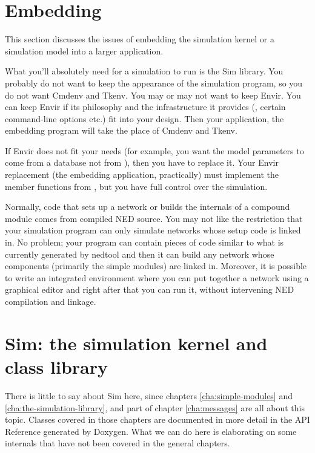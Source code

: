 \section{Embedding {\opp}}
\label{sec:ch-opp-design:embedding}

This section discusses the issues of embedding the simulation kernel
or a simulation model into a larger application.

What you'll absolutely need for a simulation to run is the Sim library. You
probably do not want to keep the appearance of the simulation program, so
you do not want Cmdenv and Tkenv. You may or may not want to keep Envir.
You can keep Envir if its philosophy and the infrastructure it provides
(, certain command-line options etc.) fit into your
design. Then your application, the embedding program will take the place of
Cmdenv and Tkenv.

If Envir does not fit your needs (for example, you want the model
parameters to come from a database not from ), then you
have to replace it. Your Envir replacement (the embedding application,
practically) must implement the  member functions from
, but you have full control over the simulation.

Normally, code that sets up a network or builds the internals of a
compound module comes from compiled NED source.  You may not like the
restriction that your simulation program can only simulate networks
whose setup code is linked in. No problem; your program can contain
pieces of code similar to what is currently generated by nedtool and then 
it can build any network whose components (primarily the simple modules) 
are linked in. Moreover, it is possible to write an integrated environment 
where you can put together a network using a graphical editor and right
after that you can run it, without intervening NED compilation and
linkage.





\section{Sim: the simulation kernel and class library}

There is little to say about Sim here, since chapters
\ref{cha:simple-modules} and \ref{cha:the-simulation-library},
and part of chapter \ref{cha:messages} are all about
this topic. Classes covered in those chapters are documented
in more detail in the API Reference generated by Doxygen.
What we can do here is elaborating on some internals
that have not been covered in the general chapters.

